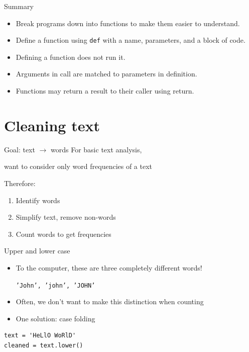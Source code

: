 \documentclass[aspectratio=169,usenames,dvipsnames]{beamer}
\begin{document}
\begin{frame}{Summary}
    \begin{itemize}
        \item Break programs down into functions to make them easier
            to understand.
        \item Define a function using \texttt{def} with a name, parameters,
            and a block of code.
        \item Defining a function does not run it.
        \item Arguments in call are matched to parameters in definition.
        \item Functions may return a result to their caller using return.
    \end{itemize}
\end{frame}




\section{Cleaning text}
\frame{\tableofcontents[currentsection]}
\begin{frame}{Goal: text $\rightarrow$ words}
    For basic text analysis,

    want to consider only word frequencies of a text

    \pause
    Therefore:
    \begin{enumerate}
        \item Identify words
        \item Simplify text, remove non-words
        \item Count words to get frequencies
    \end{enumerate}
\end{frame}

\begin{frame}[fragile]{Upper and lower case}
    \begin{itemize}
        \item To the computer, these
            are three completely different words!

            \texttt{'John', 'john', 'JOHN'}
        \item Often, we don't want to make this distinction when counting
        \item One solution: case folding
    \end{itemize}
    \pause
\begin{lstlisting}
text = 'HeLlO WoRlD'
cleaned = text.lower()
\end{lstlisting}
\end{frame}
\end{document}
